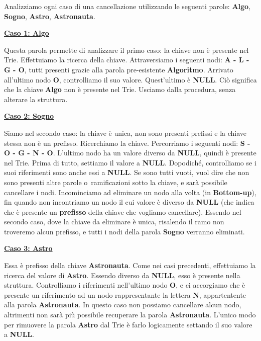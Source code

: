 \documentclass[a4paper, 12pt]{article}
\begin{document}
Analizziamo ogni caso di una cancellazione utilizzando le seguenti parole: \textbf{Algo}, \textbf{Sogno}, \textbf{Astro}, \textbf{Astronauta}.

\clearpage

\textbf{\underline{Caso 1: Algo}}

\vspace{5mm}
Questa parola permette di analizzare il primo caso: la chiave non è presente nel Trie.
Effettuiamo la ricerca della chiave. Attraversiamo i seguenti nodi: \textbf{A - L - G - O}, tutti presenti grazie alla parola pre-esistente \textbf{Algoritmo}.
Arrivato all'ultimo nodo \textbf{O}, controlliamo il suo valore. Quest'ultimo è \textbf{NULL}. Ciò significa che la chiave \textbf{Algo} non è presente nel Trie. Usciamo dalla procedura, senza alterare la struttura.

\vspace{5mm}

\textbf{\underline{Caso 2: Sogno}}

\vspace{5mm}
Siamo nel secondo caso: la chiave è unica, non sono presenti prefissi e la chiave stessa non è un prefisso.
Ricerchiamo la chiave. Percorriamo i seguenti nodi: \textbf{S - O - G - N - O}. L'ultimo nodo ha un valore diverso da \textbf{NULL}, quindi è presente nel Trie. 
Prima di tutto, settiamo il valore a \textbf{NULL}. Dopodiché, controlliamo se i suoi riferimenti sono anche essi a \textbf{NULL}. Se sono tutti vuoti, vuol dire che non sono presenti altre parole o~ramificazioni sotto la chiave, e sarà possibile cancellare i nodi. Incominciamo ad eliminare un nodo alla volta (in \textbf{Bottom-up}), fin quando non incontriamo un nodo il cui valore è diverso da \textbf{NULL} (che indica che è presente un \textbf{prefisso} della chiave che vogliamo cancellare). Essendo nel secondo caso, dove la chiave da eliminare è unica, risalendo il ramo non troveremo alcun prefisso, e tutti i nodi della parola \textbf{Sogno} verranno eliminati.

\clearpage

\textbf{\underline{Caso 3: Astro}}

\vspace{5mm}
Essa è prefisso della chiave \textbf{Astronauta}. Come nei casi precedenti, effettuiamo la ricerca del valore di \textbf{Astro}. Essendo diverso da \textbf{NULL}, esso è presente nella struttura. Controlliamo i riferimenti nell'ultimo nodo \textbf{O}, e ci accorgiamo che è presente un riferimento ad un nodo rappresentante la lettera \textbf{N}, appartentente alla parola \textbf{Astronauta}. In questo caso non possiamo cancellare alcun nodo, altrimenti non sarà più possibile recuperare la parola \textbf{Astronauta}. L'unico modo per rimuovere la parola \textbf{Astro} dal Trie è farlo logicamente settando il suo valore a \textbf{NULL}.
\end{document}
